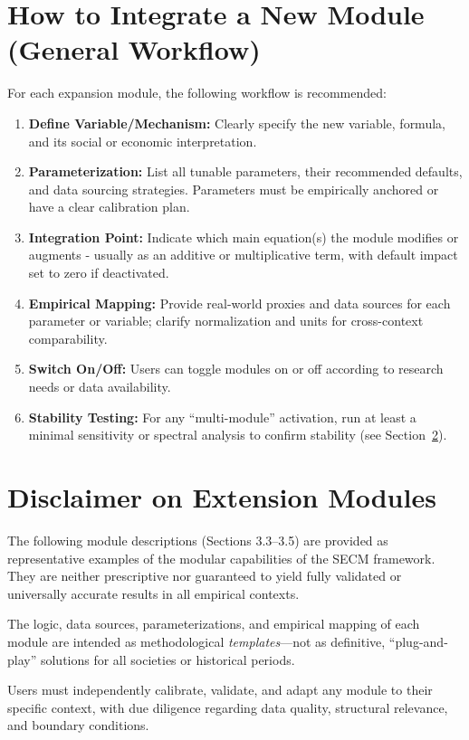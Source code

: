 \documentclass[12pt]{report}
\begin{document}
\section{How to Integrate a New Module (General Workflow)}
For each expansion module, the following workflow is recommended:

\begin{enumerate}
  \item \textbf{Define Variable/Mechanism:} Clearly specify the new variable, formula, and its social or economic interpretation.
  \item \textbf{Parameterization:} List all tunable parameters, their recommended defaults, and data sourcing strategies. Parameters must be empirically anchored or have a clear calibration plan.
  \item \textbf{Integration Point:} Indicate which main equation(s) the module modifies or augments - usually as an additive or multiplicative term, with default impact set to zero if deactivated.
  \item \textbf{Empirical Mapping:} Provide real-world proxies and data sources for each parameter or variable; clarify normalization and units for cross-context comparability.
  \item \textbf{Switch On/Off:} Users can toggle modules on or off according to research needs or data availability.
  \item \textbf{Stability Testing:} For any ``multi-module'' activation, run at least a minimal sensitivity or spectral analysis to confirm stability (see Section~\ref{sec:module_stability}).
\end{enumerate}

\section{Disclaimer on Extension Modules}\label{sec:module_stability}
The following module descriptions (Sections 3.3–3.5) are provided as representative examples of the modular capabilities of the SECM framework. They are neither prescriptive nor guaranteed to yield fully validated or universally accurate results in all empirical contexts.

The logic, data sources, parameterizations, and empirical mapping of each module are intended as methodological \textit{templates}—not as definitive, ``plug-and-play'' solutions for all societies or historical periods.

Users must independently calibrate, validate, and adapt any module to their specific context, with due diligence regarding data quality, structural relevance, and boundary conditions.
\end{document}
